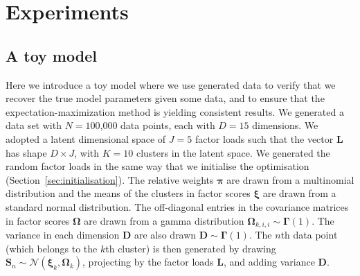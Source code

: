 \documentclass[twocolumn]{aastex62}
\newcommand{\vect}[1]{\boldsymbol{\mathbf{#1}}}
\renewcommand{\vec}[1]{\vect{#1}}
\newcommand{\weight}{\pi}
\newcommand{\data}{\textbf{Y}}
\newcommand{\factorloads}{\textbf{L}}
\newcommand{\factorscores}{\textbf{S}}
\newcommand{\specificvariance}{\vec{D}}
\newcommand{\scoremeans}{\vec\xi}
\newcommand{\scorecovs}{\vec\Omega}
\newcommand{\NumData}{N}
\newcommand{\NumDimensions}{D}
\newcommand{\numdata}{n}
\newcommand{\NumLatentFactors}{J}
\newcommand{\NumComponents}{K}
\newcommand{\numcomponents}{k}
\begin{document}




\section{Experiments} \label{sec:experiments}


\subsection{A toy model} \label{sec:exp-1}

Here we introduce a toy model where we use generated data to verify that
we recover the true model parameters given some data, and to
ensure that the expectation-maximization method is yielding consistent results.
We generated a data set with ${\NumData = 1}$00,000 data points, each with
$\NumDimensions = 15$ dimensions. We adopted a latent dimensional space of 
$\NumLatentFactors = 5$ factor loads such that the vector $\factorloads$ has
shape $\NumDimensions \times \NumLatentFactors$,
with $\NumComponents = 10$ clusters in the latent space. 
We generated the random factor loads in the same way that we initialise the optimisation (Section~\ref{sec:initialisation}). The relative weights $\vec\weight$
are drawn from a multinomial distribution and the means of the clusters
in factor scores $\scoremeans$ are drawn from a standard normal
distribution. The off-diagonal entries in the covariance matrices in factor scores $\scorecovs$ are drawn from a gamma distribution $\scorecovs_{\numcomponents,i,i} \sim \vec\Gamma\left(1\right)$. The variance in 
each dimension $\specificvariance$ are also drawn $\specificvariance \sim \vec\Gamma\left(1\right)$.
The $\numdata$th data point (which belongs to the $\numcomponents$th cluster) is then
generated by drawing $\factorscores_{\numdata} \sim \mathcal{N}(\scoremeans_\numcomponents,\scorecovs_\numcomponents)$, projecting by the factor loads $\factorloads$, and adding variance $\specificvariance$.
\end{document}
